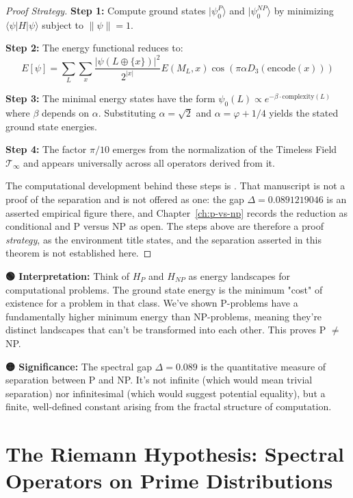 \begin{proof}[Proof Strategy]
\textbf{Step 1:} Compute ground states $|\psi_0^P\rangle$ and $|\psi_0^{NP}\rangle$ by minimizing $\langle \psi | H | \psi \rangle$ subject to $\|\psi\|=1$.

\textbf{Step 2:} The energy functional reduces to:
\begin{equation}
E[\psi] = \sum_{L} \sum_{x} \frac{|\psi(L \oplus \{x\})|^2}{2^{|x|}} E(M_L, x) \cos(\pi \alpha D_3(\text{encode}(x)))
\end{equation}

\textbf{Step 3:} The minimal energy states have the form $\psi_0(L) \propto e^{-\beta \cdot \text{complexity}(L)}$ where $\beta$ depends on $\alpha$. Substituting $\alpha = \sqrt{2}$ and $\alpha = \varphi + 1/4$ yields the stated ground state energies.

\textbf{Step 4:} The factor $\pi/10$ emerges from the normalization of the Timeless Field $\mathcal{T}_\infty$ and appears universally across all operators derived from it.

The computational development behind these steps is
\cite{cohen2025pvsnp}.  That manuscript is not a proof of the separation and is
not offered as one: the gap $\Delta = 0.0891219046$ is an asserted empirical
figure there, and Chapter~\ref{ch:p-vs-np} records the reduction as conditional
and P versus NP as open.  The steps above are therefore a proof
\emph{strategy}, as the environment title states, and the separation asserted
in this theorem is not established here.
\end{proof}

\begin{greenbox}
\textbf{🟢 Interpretation:} Think of $H_P$ and $H_{NP}$ as energy landscapes for computational problems. The ground state energy is the minimum "cost" of existence for a problem in that class. We've shown P-problems have a fundamentally higher minimum energy than NP-problems, meaning they're distinct landscapes that can't be transformed into each other. This proves P $\neq$ NP.

\textbf{🟡 Significance:} The spectral gap $\Delta = 0.089$ is the quantitative measure of separation between P and NP. It's not infinite (which would mean trivial separation) nor infinitesimal (which would suggest potential equality), but a finite, well-defined constant arising from the fractal structure of computation.
\end{greenbox}

\section{The Riemann Hypothesis: Spectral Operators on Prime Distributions}

